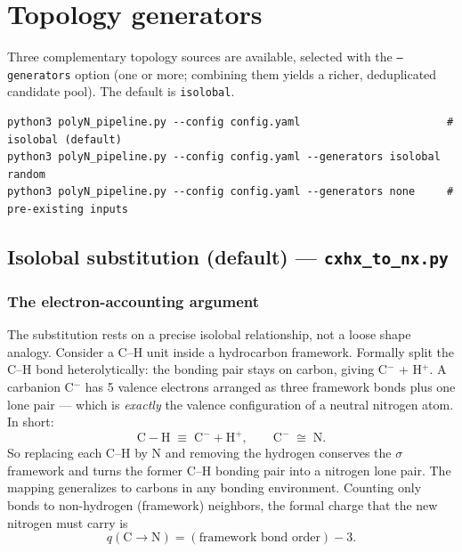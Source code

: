 \documentclass[11pt,a4paper]{article}
\begin{document}
\section{Topology generators}
\label{sec:generators}

Three complementary topology sources are available, selected with the
\texttt{--generators} option (one or more; combining them yields a richer,
deduplicated candidate pool). The default is \texttt{isolobal}.

\begin{lstlisting}
python3 polyN_pipeline.py --config config.yaml                       # isolobal (default)
python3 polyN_pipeline.py --config config.yaml --generators isolobal random
python3 polyN_pipeline.py --config config.yaml --generators none     # pre-existing inputs
\end{lstlisting}

\subsection{Isolobal substitution (default) --- \texttt{cxhx\_to\_nx.py}}
\label{sec:isolobal}

\subsubsection{The electron-accounting argument}

The substitution rests on a precise isolobal relationship, not a loose shape
analogy. Consider a C--H unit inside a hydrocarbon framework. Formally split
the C--H bond heterolytically: the bonding pair stays on carbon, giving
C$^{-}$ + H$^{+}$. A carbanion C$^{-}$ has 5 valence electrons arranged as
three framework bonds plus one lone pair --- which is \emph{exactly} the
valence configuration of a neutral nitrogen atom. In short:
\[
  \mathrm{C\!-\!H} \;\equiv\; \mathrm{C}^{-} + \mathrm{H}^{+},
  \qquad \mathrm{C}^{-} \;\cong\; \mathrm{N}.
\]
So replacing each C--H by N and removing the hydrogen conserves the $\sigma$
framework and turns the former C--H bonding pair into a nitrogen lone pair.
The mapping generalizes to carbons in any bonding environment. Counting only
bonds to non-hydrogen (framework) neighbors, the formal charge that the new
nitrogen must carry is
\[
  q(\mathrm{C}\rightarrow\mathrm{N})
    = (\text{framework bond order}) - 3.
\]
\end{document}
